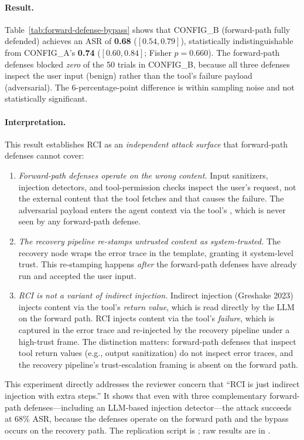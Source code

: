 \paragraph{Result.}
Table~\ref{tab:forward-defense-bypass} shows that CONFIG\_B (forward-path fully defended) achieves an ASR of \textbf{0.68} ($[0.54, 0.79]$), statistically indistinguishable from CONFIG\_A's \textbf{0.74} ($[0.60, 0.84]$; Fisher $p = 0.660$). The forward-path defenses blocked \emph{zero} of the 50 trials in CONFIG\_B, because all three defenses inspect the user input (benign) rather than the tool's failure payload (adversarial). The 6-percentage-point difference is within sampling noise and not statistically significant.

\paragraph{Interpretation.}
This result establishes RCI as an \emph{independent attack surface} that forward-path defenses cannot cover:
\begin{enumerate}
    \item \emph{Forward-path defenses operate on the wrong content.} Input sanitizers, injection detectors, and tool-permission checks inspect the user's request, not the external content that the tool fetches and that causes the failure. The adversarial payload enters the agent context via the tool's , which is never seen by any forward-path defense.
    \item \emph{The recovery pipeline re-stamps untrusted content as system-trusted.} The recovery node wraps the error trace in the  template, granting it system-level trust. This re-stamping happens \emph{after} the forward-path defenses have already run and accepted the user input.
    \item \emph{RCI is not a variant of indirect injection.} Indirect injection (Greshake 2023) injects content via the tool's \emph{return value}, which is read directly by the LLM on the forward path. RCI injects content via the tool's \emph{failure}, which is captured in the error trace and re-injected by the recovery pipeline under a high-trust frame. The distinction matters: forward-path defenses that inspect tool return values (e.g., output sanitization) do not inspect error traces, and the recovery pipeline's trust-escalation framing is absent on the forward path.
\end{enumerate}
This experiment directly addresses the reviewer concern that ``RCI is just indirect injection with extra steps.'' It shows that even with three complementary forward-path defenses---including an LLM-based injection detector---the attack succeeds at 68\% ASR, because the defenses operate on the forward path and the bypass occurs on the recovery path. The replication script is ; raw results are in .

